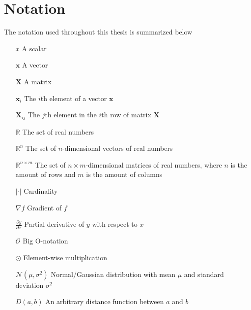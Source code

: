 \documentclass[./main.tex]{subfiles}
\begin{document}
\section{Notation}
The notation used throughout this thesis is summarized below

\begin{itemize}[leftmargin=2.0cm,labelsep=0.5cm]
    \item[$x$] A scalar
    \item[$\bm{x}$] A vector
    \item[$\bm{X}$] A matrix
    \item[$\bm{x}_i$] The $i$th element of a vector $\bm{x}$ 
    \item[$\bm{X}_{ij}$] The $j$th element in the $i$th row of matrix $\bm{X}$
    \item[$\mathbb{R}$] The set of real numbers
    \item[$\mathbb{R}^n$] The set of $n$-dimensional vectors of real numbers
    \item[$\mathbb{R}^{n \times m}$] The set of $n \times m$-dimensional matrices of real numbers, where $n$ is the amount of rows and $m$ is the amount of columns
    \item[$|\cdot|$] Cardinality
    \item[$\nabla f$] Gradient of $f$
    \item[$\frac{\partial y}{\partial x}$] Partial derivative of $y$ with respect to $x$
    \item[$\mathcal{O}$] Big O-notation
    \item[$\odot$] Element-wise multiplication
    \item[$\mathcal{N} \left(\mu, \sigma^2 \right)$] Normal/Gaussian distribution with mean $\mu$ and standard deviation $\sigma^2$
    \item[$D(a, b)$] An arbitrary distance function between $a$ and $b$
\end{itemize}
\end{document}
